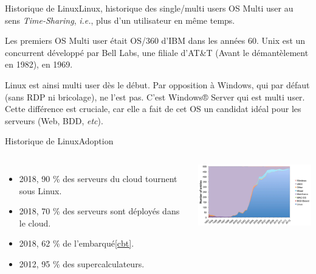 \documentclass{beamer}
\begin{document}
    \begin{frame}{Historique de Linux}{Linux, historique des single/multi users OS}
        Multi user au sens \textit{Time-Sharing}, \textit{i.e.}, plus d'un utilisateur en même temps.

        Les premiers OS Multi user était OS/360 d'IBM dans les années 60.
        Unix est un concurrent développé par Bell Labs, une filiale d'AT\&T (Avant le démantèlement en 1982), en 1969.

        Linux est ainsi multi user dès le début.
        Par opposition à Windows, qui par défaut (sans RDP ni bricolage), ne l'est pas.
        C'est Windows® Server qui est multi user.
        \bigbreak
        Cette différence est cruciale, car elle a fait de cet OS un candidat idéal pour les serveurs (Web, BDD, \textit{etc}).
    \end{frame}

    \begin{frame}{Historique de Linux}{Adoption}
        \begin{columns}
            \begin{itemize}
                \item 2018, 90 \% des serveurs du cloud tournent sous Linux\footnotemark.
                \item 2018, 70 \% des serveurs sont déployés dans le cloud\footnotemark.
                \item 2018, 62 \% de l'embarqué\cref{cbt}.
                \item 2012, 95 \% des supercalculateurs\footnotemark.
            \end{itemize}
            \centering
            \includegraphics[width=6cm]{image/linux-supercomputer-growth}
        \end{columns}
    \end{frame}
\end{document}
